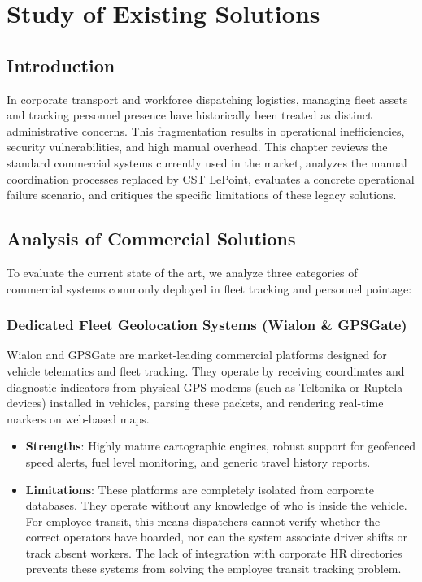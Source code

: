 \chapter{Study of Existing Solutions}
\label{chap:existing_solutions}

\section{Introduction}

In corporate transport and workforce dispatching logistics, managing fleet assets and tracking personnel presence have historically been treated as distinct administrative concerns. This fragmentation results in operational inefficiencies, security vulnerabilities, and high manual overhead. This chapter reviews the standard commercial systems currently used in the market, analyzes the manual coordination processes replaced by CST LePoint, evaluates a concrete operational failure scenario, and critiques the specific limitations of these legacy solutions.

\section{Analysis of Commercial Solutions}

To evaluate the current state of the art, we analyze three categories of commercial systems commonly deployed in fleet tracking and personnel pointage:

\subsection{Dedicated Fleet Geolocation Systems (Wialon \& GPSGate)}
Wialon and GPSGate are market-leading commercial platforms designed for vehicle telematics and fleet tracking. They operate by receiving coordinates and diagnostic indicators from physical GPS modems (such as Teltonika or Ruptela devices) installed in vehicles, parsing these packets, and rendering real-time markers on web-based maps.

\begin{itemize}
  \item \textbf{Strengths}: Highly mature cartographic engines, robust support for geofenced speed alerts, fuel level monitoring, and generic travel history reports.
  \item \textbf{Limitations}: These platforms are completely isolated from corporate databases. They operate without any knowledge of who is inside the vehicle. For employee transit, this means dispatchers cannot verify whether the correct operators have boarded, nor can the system associate driver shifts or track absent workers. The lack of integration with corporate HR directories prevents these systems from solving the employee transit tracking problem.
\end{itemize}

